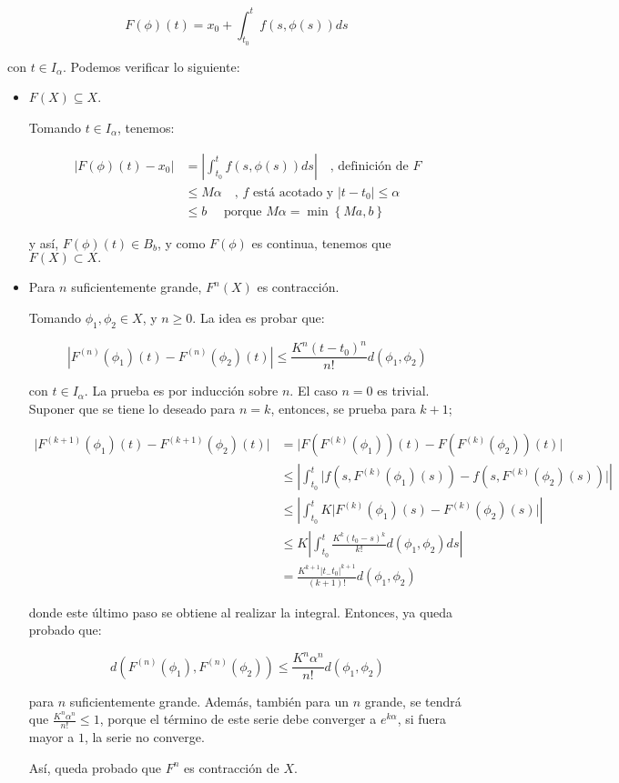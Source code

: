 \[
	F(\phi) (t) = x_0 + \int_{t_0}^{t} f(s, \phi(s)) ds
\]

con $t \in I_{\alpha}$. Podemos verificar lo siguiente:

\begin{itemize}
	\item $F(X) \subseteq X$.

	Tomando $t \in I_{\alpha}$, tenemos:

	\begin{align*}
		\lvert F(\phi)(t) - x_0 \rvert &= \left\lvert \int_{t_0}^t f(s, \phi(s)) ds \right\rvert \quad  \text{, definición de } F \\
		&\leq M \alpha \quad  \text{, } f \text{ está acotado y } \lvert t - t_0 \rvert\leq \alpha \\
		&\leq b \quad \text{ porque } M\alpha = \min \left\{ M a, b \right\}
	\end{align*}

	y así, $F(\phi)(t) \in B_b$, y como $F(\phi)$ es continua, tenemos que $F(X) \subset X.$

	\item Para $n$ suficientemente grande, $F^n (X)$ es contracción.

	Tomando $\phi_1, \phi_2 \in X$, y $n \geq 0$. La idea es probar que:

	\[
		\left\lvert F^{(n)} (\phi_1)(t) - F^{(n)} (\phi_2)(t) \right\rvert \leq \frac{K^n (t-t_0)^n}{n!} d(\phi_1, \phi_2)
	\]

	con $t \in I_{\alpha}$. La prueba es por inducción sobre $n$. El caso $n = 0$ es trivial. Suponer que se tiene lo deseado para $n = k$, entonces, se prueba para $k + 1$;

	\begin{align*}
		\lvert F^{(k+1)} (\phi_1)(t) - F^{(k+1)}(\phi_2)(t) \rvert &= \lvert F( F^{(k)}(\phi_1) )(t) - F( F^{(k)}(\phi_2) )(t) \rvert \\
		&\leq \left\lvert \int_{t_0}^t \lvert f(s, F^{(k)} (\phi_1)(s) ) - f(s, F^{(k)} (\phi_2)(s) )  \rvert \right\rvert \\
		&\leq \left\lvert \int_{t_0}^t K \lvert F^{(k)} (\phi_1)(s) - F^{(k)} (\phi_2)(s) \rvert \right\rvert \\
		&\leq K \left\lvert \int_{t_0}^t \frac{K^k (t_0 - s)^k}{k!} d(\phi_1, \phi_2) ds \right\rvert\\
		&= \frac{K^{k+1} \lvert t_ - t_0 \rvert^{k+1} }{(k+1)!} d(\phi_1, \phi_2)
	\end{align*}

	donde este último paso se obtiene al realizar la integral. Entonces, ya queda probado que:

	\[
		d( F^{(n)} (\phi_1), F^{(n)} (\phi_2) ) \leq \frac{K^n \alpha^n}{n!} d(\phi_1, \phi_2)
	\]

	para $n$ suficientemente grande. Además, también para un $n$ grande, se tendrá que $\frac{K^n \alpha^n}{n!} \leq 1$, porque el término de este serie debe converger a $e^{k\alpha}$, si fuera mayor a $1$, la serie no converge.

	Así, queda probado que $F^{n}$ es contracción de $X$.

\end{itemize}

